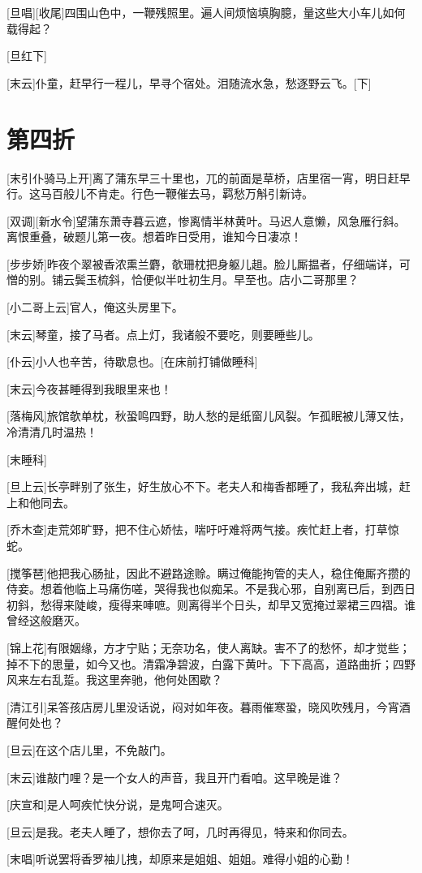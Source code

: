 \documentclass{book}
\newcommand\nchapter[1]{\chapter*{#1}\markboth{#1}{}\addcontentsline{toc}{chapter}{#1}}
\begin{document}
[旦唱][收尾]四围山色中，一鞭残照里。遍人间烦恼填胸臆，量这些大小车儿如何载得起？

[旦红下]

[末云]仆童，赶早行一程儿，早寻个宿处。泪随流水急，愁逐野云飞。[下]

\nchapter{第四折}

[末引仆骑马上开]离了蒲东早三十里也，兀的前面是草桥，店里宿一宵，明日赶早行。这马百般儿不肯走。行色一鞭催去马，羁愁万斛引新诗。

[双调][新水令]望蒲东萧寺暮云遮，惨离情半林黄叶。马迟人意懒，风急雁行斜。离恨重叠，破题儿第一夜。想着昨日受用，谁知今日凄凉！

[步步娇]昨夜个翠被香浓熏兰麝，欹珊枕把身躯儿趄。脸儿厮揾者，仔细端详，可憎的别。铺云鬓玉梳斜，恰便似半吐初生月。早至也。店小二哥那里？

[小二哥上云]官人，俺这头房里下。

[末云]琴童，接了马者。点上灯，我诸般不要吃，则要睡些儿。

[仆云]小人也辛苦，待歇息也。[在床前打铺做睡科]

[末云]今夜甚睡得到我眼里来也！

[落梅风]旅馆欹单枕，秋蛩鸣四野，助人愁的是纸窗儿风裂。乍孤眠被儿薄又怯，冷清清几时温热！

[末睡科]

[旦上云]长亭畔别了张生，好生放心不下。老夫人和梅香都睡了，我私奔出城，赶上和他同去。

[乔木查]走荒郊旷野，把不住心娇怯，喘吁吁难将两气接。疾忙赶上者，打草惊蛇。

[搅筝琶]他把我心肠扯，因此不避路途赊。瞒过俺能拘管的夫人，稳住俺厮齐攒的侍妾。想着他临上马痛伤嗟，哭得我也似痴呆。不是我心邪，自别离已后，到西日初斜，愁得来陡峻，瘦得来唓嗻。则离得半个日头，却早又宽掩过翠裙三四褶。谁曾经这般磨灭。

[锦上花]有限姻缘，方才宁贴；无奈功名，使人离缺。害不了的愁怀，却才觉些；掉不下的思量，如今又也。清霜净碧波，白露下黄叶。下下高高，道路曲折；四野风来左右乱踅。我这里奔驰，他何处困歇？

[清江引]呆答孩店房儿里没话说，闷对如年夜。暮雨催寒蛩，晓风吹残月，今宵酒醒何处也？

[旦云]在这个店儿里，不免敲门。

[末云]谁敲门哩？是一个女人的声音，我且开门看咱。这早晚是谁？

[庆宣和]是人呵疾忙快分说，是鬼呵合速灭。

[旦云]是我。老夫人睡了，想你去了呵，几时再得见，特来和你同去。

[末唱]听说罢将香罗袖儿拽，却原来是姐姐、姐姐。难得小姐的心勤！
\end{document}
